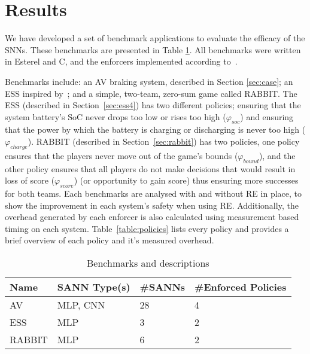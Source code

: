 
\section{Results}
\label{sec:resultsc4}

We have developed a set of benchmark applications to evaluate the efficacy of the \acp{SNN}.
These benchmarks are presented in Table \ref{table:benchmarks4}.
All benchmarks were written in Esterel and C, and the enforcers implemented according to~\cite{recps}.

Benchmarks include: an \acf{AV} braking system, described in Section \ref{sec:case}; an \acf{ESS} inspired by~\cite{chaudhari2017hybrid}; and a simple, two-team, zero-sum game called RABBIT.
The \ac{ESS} (described in Section~\ref{sec:ess4}) has two different policies; ensuring that the system battery's \ac{SoC} never drops too low or rises too high  ($\varphi_{soc}$) and ensuring that the power by which the battery is charging or discharging is never too high ($\varphi_{charge}$).
RABBIT (described in Section~\ref{sec:rabbit}) has two policies, one policy ensures that the players never move out of the game's bounds ($\varphi_{bound}$), and the other policy ensures that all players do not make decisions that would result in loss of score ($\varphi_{score}$) (or opportunity to gain score) thus ensuring more successes for both teams.
Each benchmarks are analysed with and without \ac{RE} in place, to show the improvement in each system's safety when using \ac{RE}.
Additionally, the overhead generated by each enforcer is also calculated using measurement based timing on each system. 
Table~\ref{table:policies} lists every policy and provides a brief overview of each policy and it's measured overhead. 

\begin{table}[H]
	\centering
	\caption{Benchmarks and descriptions}
	\label{table:benchmarks4}
	\begin{tabular}{@{}|l|l|l|l|@{}}
		\hline
		Name & \ac{SANN} Type(s) & \#\acp{SANN} & \#Enforced Policies \\ \hline
		\acs{AV} & \ac{MLP}, \ac{CNN}  & 28 & 4 \\
		\acs{ESS} & \ac{MLP} & 3 & 2 \\
		RABBIT & \ac{MLP}  & 6 & 2 \\
		\hline
	\end{tabular}
\end{table}

